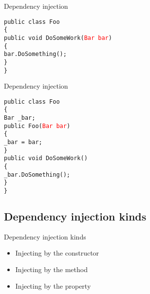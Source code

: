 \documentclass{beamer}
\newcommand{\code}[1]{{\texttt{#1}}}
\begin{document}
\begin{frame}{Dependency injection}
     \begin{large}
	\code{public class Foo}\\
	\code{\{}\\ \quad
		\code{public void DoSomeWork(\textcolor{red}{Bar bar})}\\ \quad
		\code{\{}\\ \qquad
		\code{bar.DoSomething();}\\ \quad
		\code{\}}\\
	\code{\}}
     \end{large}
\end{frame}

\begin{frame}{Dependency injection}
     \begin{large}
	\code{public class Foo}\\
	\code{\{}\\ \quad
		\code{Bar \_bar;}\\ \quad
		\code{public Foo(\textcolor{red}{Bar bar})}\\ \quad
		\code{\{}\\ \qquad
		\code{\_bar = bar;}\\ \quad
		\code{\}}\\ \quad
		\code{public void DoSomeWork()}\\ \quad
		\code{\{}\\ \qquad
		\code{\_bar.DoSomething();}\\ \quad
		\code{\}}\\
	\code{\}}
     \end{large}
\end{frame}

\subsection*{Dependency injection kinds}

\begin{frame}{Dependency injection kinds}
     \begin{Large}
	\begin{itemize}
		\item Injecting by the constructor
		\item Injecting by the method
		\item Injecting by the property
	\end{itemize}
     \end{Large}
\end{frame}
\end{document}

